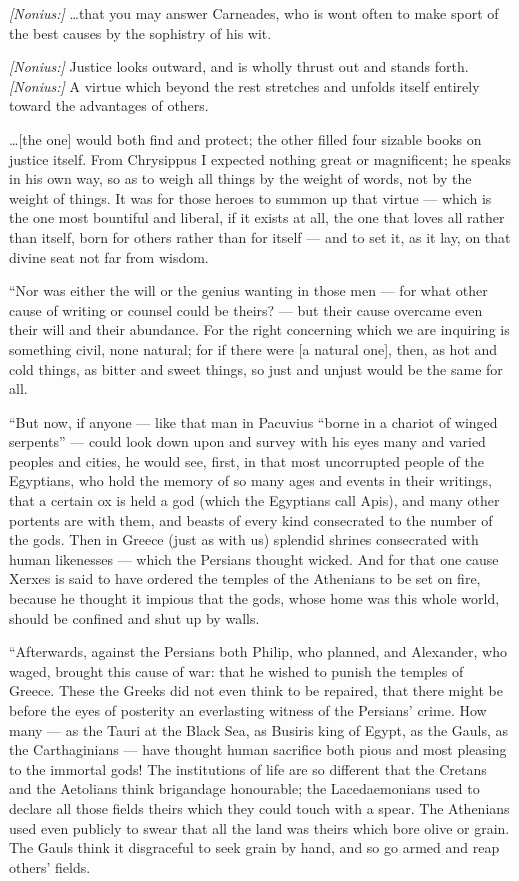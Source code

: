  \textit{[Nonius:]} \ldots that you may answer Carneades, who is wont often to make sport of the best causes by the sophistry of his wit.

 \textit{[Nonius:]} Justice looks outward, and is wholly thrust out and stands forth. \textit{[Nonius:]} A virtue which beyond the rest stretches and unfolds itself entirely toward the advantages of others.

 \ldots [the one] would both find and protect; the other filled four sizable books on justice itself. From Chrysippus I expected nothing great or magnificent; he speaks in his own way, so as to weigh all things by the weight of words, not by the weight of things. It was for those heroes to summon up that virtue --- which is the one most bountiful and liberal, if it exists at all, the one that loves all rather than itself, born for others rather than for itself --- and to set it, as it lay, on that divine seat not far from wisdom.

 ``Nor was either the will or the genius wanting in those men --- for what other cause of writing or counsel could be theirs? --- but their cause overcame even their will and their abundance. For the right concerning which we are inquiring is something civil, none natural; for if there were [a natural one], then, as hot and cold things, as bitter and sweet things, so just and unjust would be the same for all.

 ``But now, if anyone --- like that man in Pacuvius ``borne in a chariot of winged serpents'' --- could look down upon and survey with his eyes many and varied peoples and cities, he would see, first, in that most uncorrupted people of the Egyptians, who hold the memory of so many ages and events in their writings, that a certain ox is held a god (which the Egyptians call Apis), and many other portents are with them, and beasts of every kind consecrated to the number of the gods. Then in Greece (just as with us) splendid shrines consecrated with human likenesses --- which the Persians thought wicked. And for that one cause Xerxes is said to have ordered the temples of the Athenians to be set on fire, because he thought it impious that the gods, whose home was this whole world, should be confined and shut up by walls.

 ``Afterwards, against the Persians both Philip, who planned, and Alexander, who waged, brought this cause of war: that he wished to punish the temples of Greece. These the Greeks did not even think to be repaired, that there might be before the eyes of posterity an everlasting witness of the Persians' crime. How many --- as the Tauri at the Black Sea, as Busiris king of Egypt, as the Gauls, as the Carthaginians --- have thought human sacrifice both pious and most pleasing to the immortal gods! The institutions of life are so different that the Cretans and the Aetolians think brigandage honourable; the Lacedaemonians used to declare all those fields theirs which they could touch with a spear. The Athenians used even publicly to swear that all the land was theirs which bore olive or grain. The Gauls think it disgraceful to seek grain by hand, and so go armed and reap others' fields.

